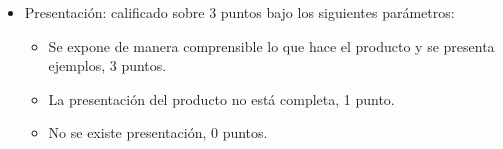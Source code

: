\documentclass[a4,11pt]{aleph-notas}
\begin{document}
\begin{itemize}
\item
    Presentación: calificado sobre 3 puntos bajo los siguientes parámetros:
    \begin{itemize}
        \item Se expone de manera comprensible lo que hace el producto y se presenta ejemplos, 3 puntos.
        \item La presentación del producto no está completa, 1 punto.
        \item No se existe presentación, 0 puntos.
    \end{itemize}
    
\end{itemize}
\end{document}
